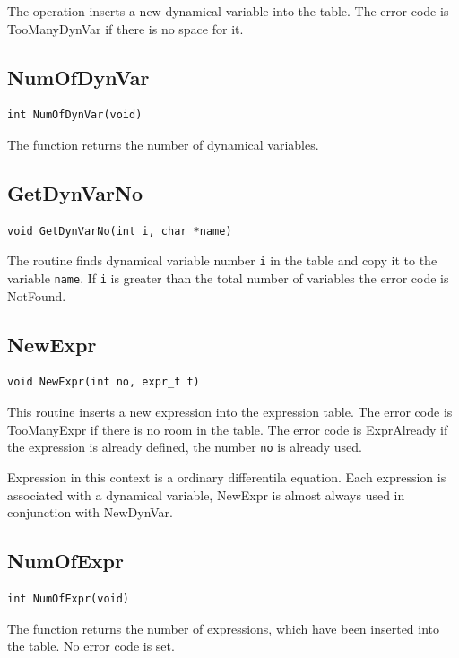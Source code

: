 The operation inserts a new dynamical variable into the table. The
error code is TooManyDynVar if there is no space for it.

\subsection{NumOfDynVar}
\begin{verbatim}
int NumOfDynVar(void)
\end{verbatim}

The function returns the number of dynamical variables.

\subsection{GetDynVarNo}
\begin{verbatim}
void GetDynVarNo(int i, char *name)
\end{verbatim}

The routine finds dynamical variable number {\tt i} in the table and
copy it to the variable {\tt name}.
If {\tt i} is greater than the total number of variables the error
code is NotFound.

\subsection{NewExpr}
\begin{verbatim}
void NewExpr(int no, expr_t t)
\end{verbatim}

This routine inserts a new expression into the expression table. The error
code is TooManyExpr if there is no room in the table. The error code is
ExprAlready if the expression is already defined, \ie the number {\tt no}
is already used.

Expression in this context is a ordinary differentila equation. Each
expression is associated with a dynamical variable, \ie NewExpr is
almost always used in conjunction with NewDynVar.

\subsection{NumOfExpr}
\begin{verbatim}
int NumOfExpr(void)
\end{verbatim}

The function returns the number of expressions, which have been inserted
into the table. No error code is set.

